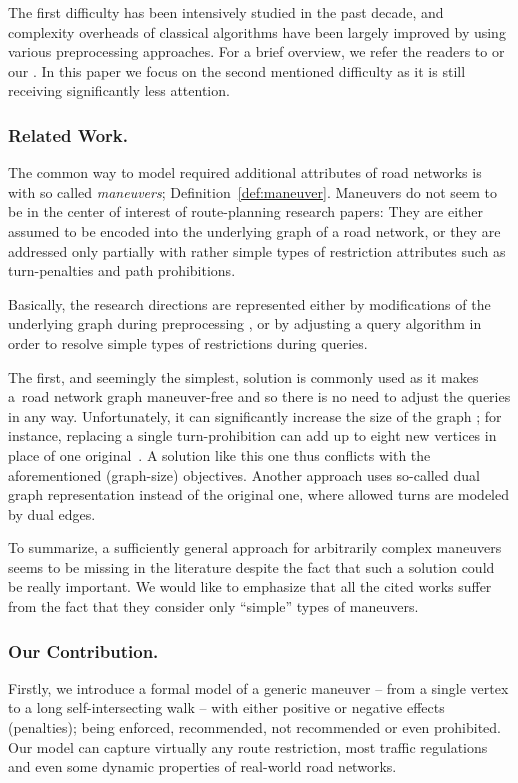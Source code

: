 \documentclass[envcountsect,envcountsame]{llncs}
\begin{document}
The first difficulty has been intensively studied in the past decade, and 
complexity overheads of classical algorithms have been largely improved by 
using various preprocessing approaches. For a brief overview, we refer the 
readers to \cite{Cherkassky1994,Delling2009B,Schultes2008} or our 
\cite{HM2011A}. In this paper we focus on the second mentioned difficulty 
as it is still receiving significantly less attention.

\subsubsection{Related Work. } 
The common way to model required additional attributes of road networks is
with so called {\em maneuvers}\/; Definition~\ref{def:maneuver}. Maneuvers 
do not seem to be in the center of interest of route-planning research papers:
They are either assumed to be encoded into the underlying graph of a road 
network, or they are addressed only partially with rather simple types of 
restriction attributes such as turn-penalties and path prohibitions.

Basically, the research directions are represented either by modifications 
of the underlying graph during preprocessing 
\cite{Jiang2002,Pallottino1997,Ziliaskopoulos1996}, or by adjusting a query 
algorithm \cite{Kirby1969,Villeneuve2005} in order to resolve simple types 
of restrictions during queries. 

The first, and seemingly the simplest, solution is commonly used as it makes 
a~road network graph maneuver-free and so there is no need to adjust the 
queries in any way. Unfortunately, it can significantly increase the size 
of the graph \cite{Winter2002}; for instance, replacing a single 
turn-prohibition can add up to eight new vertices in place of one 
original~\cite{Gutierrez2008}. A solution like this one thus conflicts with 
the aforementioned (graph-size) objectives. Another approach \cite{Anez1996} 
uses so-called dual graph representation instead of the original one, where 
allowed turns are modeled by dual edges. 

To summarize, a sufficiently general approach for arbitrarily complex 
maneuvers seems to be missing in the literature despite the fact that such 
a solution could be really important. We would like to emphasize that all 
the cited works suffer from the fact that they consider only ``simple'' types 
of maneuvers.

\vspace{-1.5ex}
\subsubsection{Our Contribution. } Firstly, we introduce a formal model of a 
generic maneuver -- from a single vertex to a long self-intersecting walk 
-- with either positive or negative effects (penalties); being enforced, 
recommended, not recommended or even prohibited. Our model can capture 
virtually any route restriction, most traffic regulations and even some 
dynamic properties of real-world road networks. 
\end{document}
